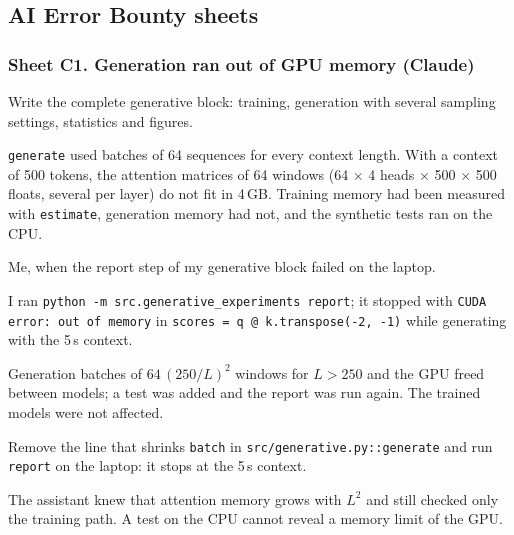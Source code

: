 \subsection*{AI Error Bounty sheets}

\subsubsection*{Sheet C1. Generation ran out of GPU memory (Claude)}
\begin{description}[style=nextline,leftmargin=1.2em]
  \item[Prompt] Write the complete generative block: training, generation with several sampling settings,
        statistics and figures.
  \item[Faulty response] \texttt{generate} used batches of 64 sequences for every context length. With
        a context of 500 tokens, the attention matrices of 64 windows (64 $\times$ 4 heads $\times$ 500
        $\times$ 500 floats, several per layer) do not fit in 4\,GB. Training memory had been measured with
        \texttt{estimate}, generation memory had not, and the synthetic tests ran on the CPU.
  \item[Detected by] Me, when the report step of my generative block failed on the laptop.
  \item[Proof] I ran \texttt{python -m src.generative\_experiments report}; it stopped with
        \texttt{CUDA error: out of memory} in \texttt{scores = q @ k.transpose(-2, -1)} while generating
        with the 5\,s context.
  \item[Correction] Generation batches of $64\,(250/L)^2$ windows for $L > 250$ and the GPU freed between
        models; a test was added and the report was run again. The trained models were not affected.
  \item[Reproduction] Remove the line that shrinks \texttt{batch} in \texttt{src/generative.py::generate}
        and run \texttt{report} on the laptop: it stops at the 5\,s context.
  \item[Reflection] The assistant knew that attention memory grows with $L^2$ and still checked only the
        training path. A test on the CPU cannot reveal a memory limit of the GPU.
\end{description}

